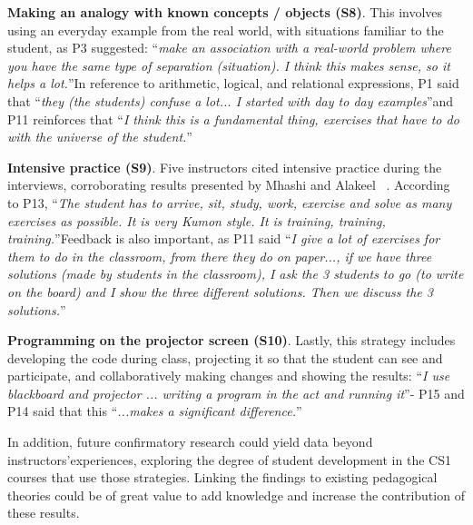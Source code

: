 \documentclass[sigconf]{acmart}
\begin{document}
\textbf{Making an analogy with known concepts / objects (S8)}. This involves using an everyday example from the real world, with situations familiar to the student, as P3 suggested: \textquotedblleft \textit{make an association with a real-world problem where you have the same type of separation (situation). I think this makes sense, so it helps a lot.}\textquotedblright \space In reference to arithmetic, logical, and relational expressions, P1 said that \textquotedblleft \textit{they (the students) confuse a lot... I started with day to day examples}\textquotedblright \space and P11 reinforces that \textquotedblleft \textit{I think this is a fundamental thing, exercises that have to do with the universe of the student.}\textquotedblright \space

\textbf{Intensive practice (S9)}. Five instructors cited intensive practice during the interviews, corroborating results presented by Mhashi and Alakeel ~\cite{Mhashi13}. According to P13, \textquotedblleft \textit{The student has to arrive, sit, study, work, exercise and solve as many exercises as possible. It is very Kumon style. It is training, training, training.}\textquotedblright \space Feedback is also important, as P11 said \textquotedblleft \textit{I give a lot of exercises for them to do in the classroom, from there they do on paper..., if we have three solutions (made by students in the classroom), I ask the 3 students to go (to write on the board) and I show the three different solutions. Then we discuss the 3 solutions.}\textquotedblright \space 

\textbf{Programming on the projector screen (S10)}. Lastly, this strategy includes developing the code during class, projecting it so that the student can see and participate, and collaboratively making changes and showing the results: \textquotedblleft \textit{I use blackboard and projector ... writing a program in the act and running it}\textquotedblright \space - P15 and P14 said that this \textquotedblleft \textit{...makes a significant difference.}\textquotedblright \space

In addition, future confirmatory research could yield data beyond instructors\textquoteright \space experiences, exploring the degree of student development in the CS1 courses that use those strategies.  Linking the findings to existing pedagogical theories could be of great value to add knowledge and increase the contribution of these results. 
\end{document}

